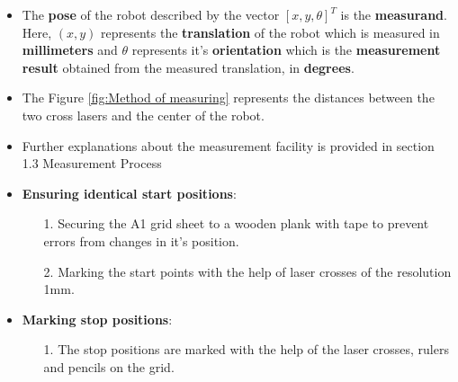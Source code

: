 {\begin{itemize}
        \item The \textbf{pose} of the robot described by the vector $[x, y, \theta]^T$ is the \textbf{measurand}. Here, $(x, y)$ represents the \textbf{translation} of the robot which is measured in \textbf{millimeters} and $\theta$ represents it's \textbf{orientation} which is the \textbf{measurement result} obtained from the measured translation, in \textbf{degrees}.

        \item The Figure \ref{fig:Method of measuring} represents the distances between the two cross lasers and the center of the robot. 

        
        
        \item Further explanations about the measurement facility is provided in section 1.3 Measurement Process
        
        \item \textbf{Ensuring identical start positions}:
        \begin{itemize}
            \item[1.] Securing the A1 grid sheet to a wooden plank with tape to prevent errors from changes in it's position. %
            \item[2.] Marking the start points with the help of laser crosses of the resolution 1mm.
        \end{itemize}
        
        \item \textbf{{Marking stop positions}}:
        \begin{itemize}
            \item[1.] The stop positions are marked with the help of the laser crosses, rulers and pencils on the grid.
        \end{itemize}
    \end{itemize}
    
    }
    

